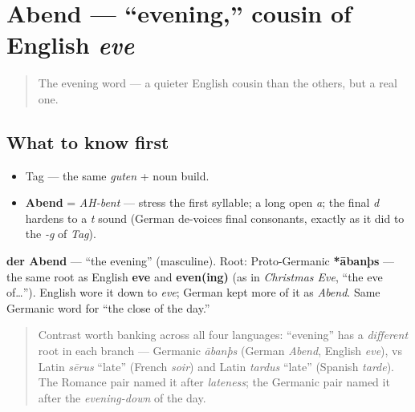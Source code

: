 \section[Abend]{Abend — \textquotedblleft{}evening,\textquotedblright{} cousin of English \emph{eve}}

\label{lesson:GE-C01-abend}



\begin{quote}
The evening word — a quieter English cousin than the others, but a real one.
\end{quote}

\subsection*{What to know first}
\begin{itemize}
\raggedright
  \item Tag — the same \emph{guten} + noun build.
\end{itemize}

\begin{sounds}
\begin{itemize}
\raggedright
  \item \textbf{Abend} = \emph{AH-bent} — stress the first syllable; a long open \emph{a}; the final \emph{d} hardens to a \emph{t} sound (German de-voices final consonants, exactly as it did to the \emph{-g} of \emph{Tag}).
\end{itemize}
\end{sounds}

\begin{cousinweb}
\textbf{der Abend} — \textquotedblleft{}the evening\textquotedblright{} (masculine). Root: Proto-Germanic \textbf{*ābanþs} — the same root as English \textbf{eve} and \textbf{even(ing)} (as in \emph{Christmas Eve}, \textquotedblleft{}the eve of…\textquotedblright{}). English wore it down to \emph{eve}; German kept more of it as \emph{Abend}. Same Germanic word for \textquotedblleft{}the close of the day.\textquotedblright{}

\begin{quote}
Contrast worth banking across all four languages: \textquotedblleft{}evening\textquotedblright{} has a \emph{different} root in each branch — Germanic \emph{ābanþs} (German \emph{Abend}, English \emph{eve}), vs Latin \emph{sērus} \textquotedblleft{}late\textquotedblright{} (French \emph{soir}) and Latin \emph{tardus} \textquotedblleft{}late\textquotedblright{} (Spanish \emph{tarde}). The Romance pair named it after \emph{lateness}; the Germanic pair named it after the \emph{evening-down} of the day.
\end{quote}
\end{cousinweb}

